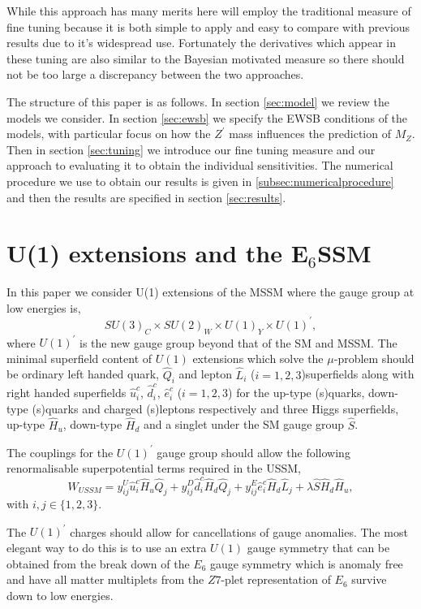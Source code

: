 \documentclass[preprint,amsmath,amssymb,aps,superscriptaddress,prd,showpacs,floatfix,nofootinbib]{revtex4-1}
\newcommand{\be}{\begin{equation}}
\newcommand{\ee}{\end{equation}}
\begin{document}
While this approach has many merits here will employ the traditional
measure of fine tuning because it is both simple to apply and easy to
compare with previous results due to it's widespread use.  Fortunately
the derivatives which appear in these tuning are also similar to the
Bayesian motivated measure so there should not be too large a
discrepancy between the two approaches.


The structure of this paper is as follows.  In section \ref{sec:model}
we review the models we consider.  In section \ref{sec:ewsb} we
specify the EWSB conditions of the models, with particular focus on
how the $Z^\prime$ mass influences the prediction of $M_Z$.  Then in
section \ref{sec:tuning} we introduce our fine tuning measure and our
approach to evaluating it to obtain the individual sensitivities.  The
numerical procedure we use to obtain our results is given in
\ref{subsec:numericalprocedure} and then the results are specified in
section \ref{sec:results}.





 

\section{\label{sec:model}U(1) extensions and the E$_6$SSM}
In this paper we consider U(1) extensions of the MSSM where the gauge
group at low energies is, \be SU(3)_C\times SU(2)_W\times U(1)_Y\times
U(1)^\prime, \ee where $U(1)^\prime$ is the new gauge group beyond
that of the SM and MSSM. The minimal superfield content of $U(1)$
extensions which solve the $\mu$-problem should be ordinary left
handed quark, $\hat{Q}_i$ and lepton $\hat{L}_i$
($i=1,2,3$)superfields along with right handed superfields
$\hat{u}^c_i$, $\hat{d}^c_i$, $\hat{e}^c_i$ ($i=1,2,3$) for the
up-type (s)quarks, down-type (s)quarks and charged (s)leptons
respectively and three Higgs superfields, up-type $\hat{H}_u$,
down-type $\hat{H}_d$ and a singlet under the SM gauge group
$\hat{S}$.

  The couplings for the $U(1)^\prime$ gauge group should allow the
  following renormalisable superpotential terms required in the USSM,
  \be W_{USSM} = y^U_{ij} \hat{u}^c_i \hat{H}_u \hat{Q}_j + y^D_{ij}
  \hat{d}^c_i \hat{H}_d \hat{Q}_j + y^E_{ij} \hat{e}^c_i \hat{H}_d
  \hat{L}_j + \lambda \hat{S} \hat{H}_d \hat{H}_u, \ee with $i,j \in
  \{1,2,3\}$.


The $U(1)^\prime$ charges should allow for cancellations of gauge
anomalies. The most elegant way to do this is to use an extra $U(1)$
gauge symmetry that can be obtained from the break down of the $E_6$
gauge symmetry which is anomaly free and have all matter multiplets
from the $Z7$-plet representation of $E_6$ survive down to low energies.
\end{document}
